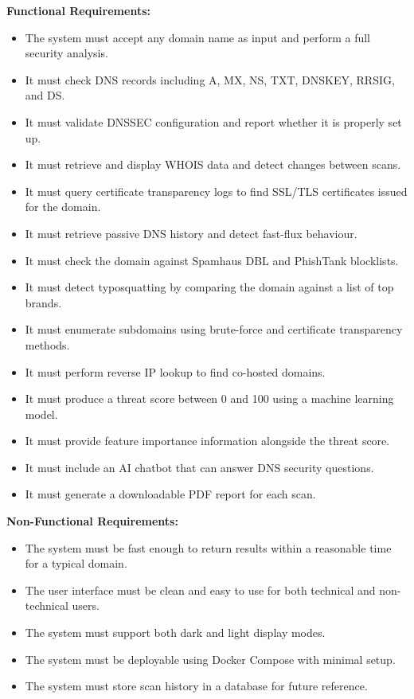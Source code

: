\documentclass[12pt, a4paper, oneside]{report}
\begin{document}
\textbf{Functional Requirements:}
\begin{itemize}
    \item The system must accept any domain name as input and perform a full security analysis.
    \item It must check DNS records including A, MX, NS, TXT, DNSKEY, RRSIG, and DS.
    \item It must validate DNSSEC configuration and report whether it is properly set up.
    \item It must retrieve and display WHOIS data and detect changes between scans.
    \item It must query certificate transparency logs to find SSL/TLS certificates issued for the domain.
    \item It must retrieve passive DNS history and detect fast-flux behaviour.
    \item It must check the domain against Spamhaus DBL and PhishTank blocklists.
    \item It must detect typosquatting by comparing the domain against a list of top brands.
    \item It must enumerate subdomains using brute-force and certificate transparency methods.
    \item It must perform reverse IP lookup to find co-hosted domains.
    \item It must produce a threat score between 0 and 100 using a machine learning model.
    \item It must provide feature importance information alongside the threat score.
    \item It must include an AI chatbot that can answer DNS security questions.
    \item It must generate a downloadable PDF report for each scan.
\end{itemize}

\textbf{Non-Functional Requirements:}
\begin{itemize}
    \item The system must be fast enough to return results within a reasonable time for a typical domain.
    \item The user interface must be clean and easy to use for both technical and non-technical users.
    \item The system must support both dark and light display modes.
    \item The system must be deployable using Docker Compose with minimal setup.
    \item The system must store scan history in a database for future reference.
\end{itemize}
\end{document}
